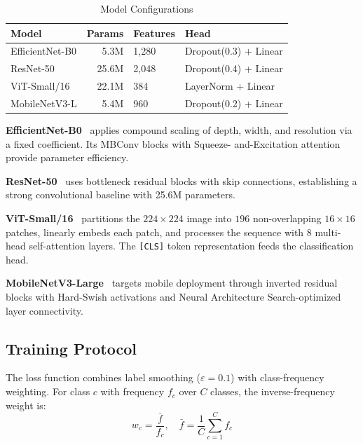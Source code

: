 \documentclass[conference]{IEEEtran}
\begin{document}
\begin{table}[htbp]
  \centering
  \caption{Model Configurations}
  \label{tab:models}
  \begin{tabular}{lrll}
    \toprule
    \textbf{Model} & \textbf{Params} & \textbf{Features} & \textbf{Head} \\
    \midrule
    EfficientNet-B0 & 5.3M  & 1{,}280 & Dropout(0.3) + Linear \\
    ResNet-50       & 25.6M & 2{,}048 & Dropout(0.4) + Linear \\
    ViT-Small/16    & 22.1M & 384     & LayerNorm + Linear     \\
    MobileNetV3-L   & 5.4M  & 960     & Dropout(0.2) + Linear  \\
    \bottomrule
  \end{tabular}
\end{table}

\textbf{EfficientNet-B0}~\cite{tan2019} applies compound scaling of depth,
width, and resolution via a fixed coefficient. Its MBConv blocks with Squeeze-
and-Excitation attention provide parameter efficiency.

\textbf{ResNet-50}~\cite{he2016} uses bottleneck residual blocks with skip
connections, establishing a strong convolutional baseline with 25.6M
parameters.

\textbf{ViT-Small/16}~\cite{dosovitskiy2021} partitions the $224\times224$
image into $196$ non-overlapping $16\times16$ patches, linearly embeds each
patch, and processes the sequence with 8 multi-head self-attention layers.
The \texttt{[CLS]} token representation feeds the classification head.

\textbf{MobileNetV3-Large}~\cite{howard2019} targets mobile deployment
through inverted residual blocks with Hard-Swish activations and Neural
Architecture Search-optimized layer connectivity.

\subsection{Training Protocol}

The loss function combines label smoothing ($\varepsilon = 0.1$) with
class-frequency weighting. For class $c$ with frequency $f_c$ over $C$
classes, the inverse-frequency weight is:
\begin{equation}
  w_c = \frac{\bar{f}}{f_c}, \quad \bar{f} = \frac{1}{C}\sum_{c=1}^C f_c
  \label{eq:classweight}
\end{equation}
\end{document}
